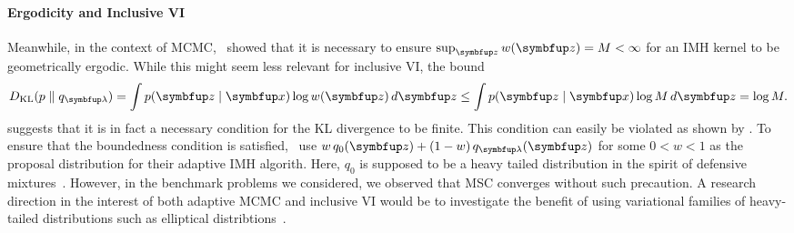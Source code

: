 \paragraph{Ergodicity and Inclusive VI}
Meanwhile, in the context of MCMC,~\citet{10.2307/2242610} showed that it is necessary to ensure \(\sup_{\vz} w(\vz) = M < \infty\) for an IMH kernel to be geometrically ergodic.
While this might seem less relevant for inclusive VI, the bound
\begin{align}
  \DKL{p}{q_{\vlambda}} = \int p(\vz\mid\vx) \log w(\vz)\,d\vz \leq \int p(\vz\mid\vx) \log M \, d\vz = \log M.
\end{align}
suggests that it is in fact a necessary condition for the KL divergence to be finite.
This condition can easily be violated as shown by \citet{10.1007/s11222-008-9110-y}.
To ensure that the boundedness condition is satisfied,~\citet{giordani_adaptive_2010} use \(w\,q_0(\vz) + (1-w)\,q_{\vlambda}(\vz)\) for some \(0<w<1\) as the proposal distribution for their adaptive IMH algorith.
Here, \(q_0\) is supposed to be a heavy tailed distribution in the spirit of defensive mixtures~\citep{hesterberg_weighted_1995}.
However, in the benchmark problems we considered, we observed that MSC converges without such precaution.
A research direction in the interest of both adaptive MCMC and inclusive VI would be to investigate the benefit of using variational families of heavy-tailed distributions such as elliptical distribtions~\citep{NEURIPS2018_25db67c5}.


